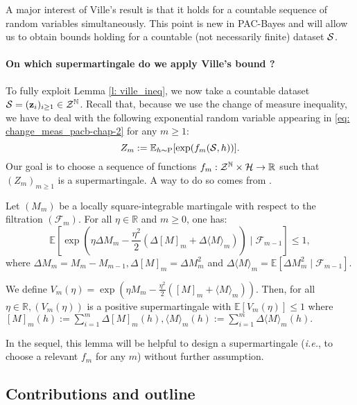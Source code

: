 A major interest of Ville's result is that it holds for a countable sequence of random variables simultaneously. This point is new in PAC-Bayes and will allow us to obtain bounds holding for a countable (not necessarily finite) dataset $\S$.

\paragraph{On which supermartingale do we apply Ville's bound ?}

To fully exploit Lemma \ref{l: ville_ineq}, we now take a countable dataset $\S= (\z_i)_{i\geq 1}\in\mathcal{Z}^{\Nbb}$.
Recall that, because we use the change of measure inequality, we have to deal with the following exponential random variable appearing in \cref{eq: change_meas_pacb-chap-2} for any $m\geq 1$:
\[ Z_m:= \mathbb{E}_{h\sim \P}[\exp(f_m(\S,h))].   \]
Our goal is to choose a sequence of functions $f_m:\Zcal^\Nbb \times \Hcal \rightarrow \Rbb$ such that $(Z_m)_{m\geq 1}$ is a supermartingale. A way to do so comes from \citet{bercu2008exponential}.
\begin{lemma}
\label{l: bercu_touati}
Let $\left(M_{m}\right)$ be a locally square-integrable martingale with respect to the filtration $(\mathcal{F}_m)$. For all $\eta \in \mathbb{R}$ and $m \geq 0$, one has:
$$\mathbb{E}\left[\exp \left(\eta \Delta M_{m}-\frac{\eta^{2}}{2}\left(\Delta[M]_{m}+\Delta\langle M\rangle_{m}\right)\right) \mid \mathcal{F}_{m-1}\right] \leq 1,
$$
where $\Delta M_{m}=M_{m}-M_{m-1}, \Delta[M]_{m}=\Delta M_{m}^{2}$ and $\Delta\langle M\rangle_{m}=\mathbb{E}\left[\Delta M_{m}^{2} \mid \mathcal{F}_{m-1}\right]$.

We define $
V_{m}(\eta)=\exp \left(\eta M_{m}-\frac{\eta^{2}}{2}\left([M]_{m}+\langle M\rangle_{m}\right)\right) .
$
Then, for all $\eta \in \mathbb{R},\left(V_{m}(\eta)\right)$ is a positive supermartingale with $\mathbb{E}\left[V_{m}(\eta)\right] \leq 1$ where $[M]_{m}(h):=\sum_{i=1}^m \Delta[M]_{m}(h),
\langle M\rangle_{m}(h):=\sum_{i=1}^m\Delta\langle M\rangle_{m}(h).$
\end{lemma}
In the sequel, this lemma will be helpful to design a supermartingale (\emph{i.e.}, to choose a relevant $f_m$ for any $m$) without further assumption.

\subsection{Contributions and outline}

